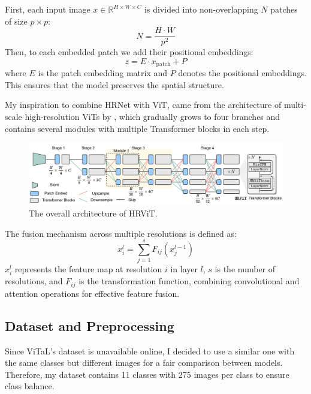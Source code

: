 \documentclass[conference]{IEEEtran}
\begin{document}
First, each input image $x \in \mathbb{R}^{H \times W \times C}$ is divided into non-overlapping $N$ patches of size $p \times p$:
\begin{equation}
    N = \frac{H \cdot W}{p^2}
\end{equation}
Then, to each embedded patch we add their positional embeddings:
\begin{equation}
    z = E \cdot x_{\text{patch}} + P
\end{equation}
where $E$ is the patch embedding matrix and $P$ denotes the positional embeddings. This ensures that the model preserves the spatial structure\cite{sebastian2024}.

My inspiration to combine HRNet with ViT, came from the architecture of multi-scale high-resolution ViTs by \cite{gu2021}, which gradually grows to four branches and contains several modules with multiple Transformer blocks in each step.

\begin{figure}
    \centering
    \includegraphics[width=\linewidth]{hrvit.png}
    \caption{The overall architecture of HRViT.}
    \label{fig:enter-label}
\end{figure}

The fusion mechanism across multiple resolutions is defined as:
\begin{equation}
    x^l_i = \sum_{j=1}^s F_{ij}(x^{l-1}_j)
\end{equation}
$x^l_i$ represents the feature map at resolution $i$ in layer $l$, $s$ is the number of resolutions, and $F_{ij}$ is the transformation function, combining convolutional and attention operations for effective feature fusion.

\subsection{Dataset and Preprocessing}
Since ViTaL's dataset is unavailable online, I decided to use a similar one with the same classes but different images \cite{sebastian2024} for a fair comparison between models. Therefore, my dataset contains 11 classes with 275 images per class to ensure class balance. 
\end{document}
